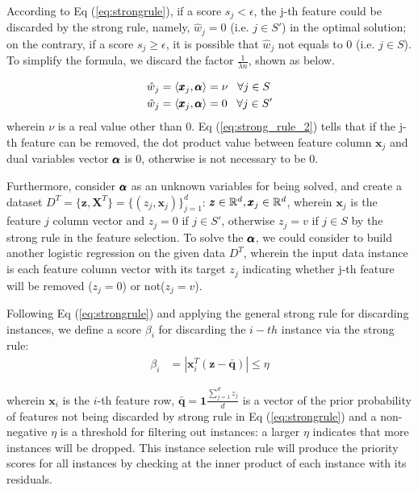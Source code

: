 According to Eq (\ref{eq:strongrule}), if a score $s_j < \epsilon$, the j-th feature could be discarded by the strong rule, namely, $\hat{w}_j = 0$ (i.e. $j\in S'$) in the optimal solution; on the contrary, if a score $s_j \geq \epsilon$, it is possible that $\hat{w}_j$ not equals to 0 (i.e. $j\in S$). To simplify the formula, we discard the factor $\frac{1}{\lambda n}$, shown as below.

\begin{align}
\hat{w}_j &= \langle \pmb{x}_{j}, \pmb{\alpha} \rangle = \nu \;\;\; \forall j \in S \nonumber \\
\hat{w}_j &= \langle \pmb{x}_{j}, \pmb{\alpha} \rangle = 0 \;\;\; \forall j \in S' \label{eq:strong_rule_2}
\end{align}
wherein $\nu$ is a real value other than 0. Eq (\ref{eq:strong_rule_2}) tells that if the j-th feature can be removed, the dot product value between feature column $\pmb{x}_j$ and dual variables vector $\pmb{\alpha}$ is 0, otherwise is not necessary to be 0. 

Furthermore, consider $\pmb{\alpha}$ as an unknown variables for being solved, and create a dataset $D^T = \{\pmb{z}, \pmb{X}^T\} = \{(z_j, \pmb{x}_j)\}_{j=1}^d$: $\pmb{z} \in \mathbb{R}^d, \pmb{x}_j \in \mathbb{R}^d $, wherein $\pmb{x}_j$ is the feature $j$ column vector and $z_j = 0$ if $j \in S'$, otherwise $z_j=v$ if $j \in S$ by the strong rule in the feature selection.  To solve the $\pmb{\alpha}$, we could consider to build another logistic regression on the given data $D^T$, wherein the input data instance is each feature column vector with its target $z_j$ indicating whether j-th feature will be removed ($z_j=0$) or not($z_j=v$).

Following Eq (\ref{eq:strongrule}) and applying the general strong rule for discarding instances, we define a score $\beta_i$ for discarding the $i-th$ instance via the strong rule:
\begin{align}
    \beta_i &= |\pmb{x}_i^T (\pmb{z} - \bar{\pmb{q}})| \leq \eta \label{eq:strong_rule_instance}
\end{align}

wherein $\pmb{x}_i$ is the $i$-th feature row, $\bar{\pmb{q}} = \pmb{1}\frac{\sum_{j=1}^d z_j}{d}$ is a vector of the prior probability of features not being discarded by strong rule in Eq (\ref{eq:strongrule}) and a non-negative $\eta$ is a threshold for filtering out instances: a larger $\eta$ indicates that more instances will be dropped. This instance selection rule will produce the priority scores for all instances by checking at the inner product of each instance with its residuals. 